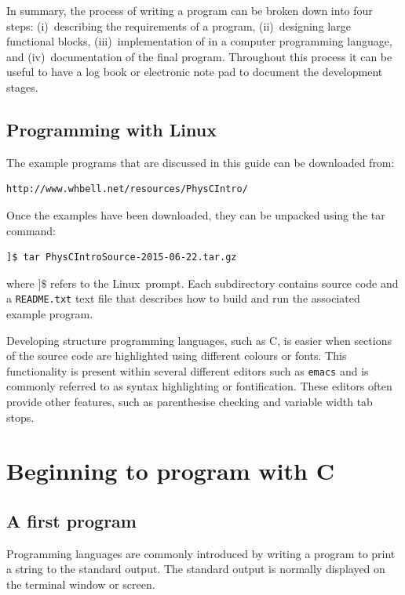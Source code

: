 \documentclass[11pt]{scrartcl}
\def\linux{Linux}
\begin{document}
In summary, the process of writing a program can be broken down into four steps: (i)~describing the requirements of a program, (ii)~designing large functional blocks, (iii)~implementation of in a computer programming language, and (iv)~documentation of the final program.  Throughout this process it can be useful to have a log book or electronic note pad to document the development stages.

\subsection{Programming with Linux}
The example programs that are discussed in this guide can be downloaded from:
\begin{verbatim}
http://www.whbell.net/resources/PhysCIntro/
\end{verbatim}
Once the examples have been downloaded, they can be unpacked using the tar command:
\begin{verbatim}
]$ tar PhysCIntroSource-2015-06-22.tar.gz
\end{verbatim} %
where \texttt{$]\$$} refers to the \linux\ prompt.  Each subdirectory contains source code and a \texttt{README.txt} text file that describes how to build and run the associated example program.

Developing structure programming languages, such as C, is easier when sections of the source code are highlighted using different colours or fonts.  This functionality is present within several different editors such as \texttt{emacs} and is commonly referred to as syntax highlighting or fontification.  These editors often provide other features, such as parenthesise checking and variable width tab stops.


\section{Beginning to program with C}

\subsection{A first program}

Programming languages are commonly introduced by writing a program to print a string to the standard output.  The standard output is normally displayed on the terminal window or screen.
\end{document}
